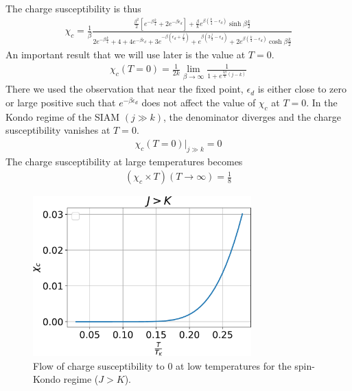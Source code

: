 \documentclass[12pt,twoside]{report}
\numberwithin{equation}{section}
\begin{document}
The charge susceptibility is thus
\begin{equation}\begin{aligned}
	\chi_c = \frac{1}{\beta}\frac{\frac{\beta^2}{2}\left[e^{-\beta \frac{k}{4}} + 2e^{-\beta \epsilon_d}\right] + \frac{\beta}{k}e^{\beta\left(\frac{k}{4} - \epsilon_d\right)}\sinh \beta\frac{k}{2}}{2e^{-\beta \frac{k}{4}} + 4 + 4e^{-\beta \epsilon_d} + 3e^{-\beta\left( \epsilon_d + \frac{j}{4} \right) } + e^{\beta\left( 3\frac{j}{4} - \epsilon_d \right)} + 2e^{\beta \left(\frac{k}{4} - \epsilon_d\right)}\cosh \beta \frac{k}{2}}
\end{aligned}\end{equation}
An important result that we will use later is the value at \(T=0\).
\begin{equation}\begin{aligned}
	\chi_c(T=0) =  \frac{1}{2k}\lim_{\beta \to \infty} \frac{1}{1 + e^{\frac{3\beta}{4} \left(j-k\right) }}
\end{aligned}\end{equation}
There we used the observation that near the fixed point, \(\epsilon_d\) is either close to zero or large positive such that \(e^{-\beta \epsilon_d}\) does not affect the value of \(\chi_c\) at \(T=0\). In the Kondo regime of the SIAM \((j \gg k)\), the denominator diverges and the charge susceptibility vanishes at \(T=0\).
\begin{equation}\begin{aligned}
	\chi_c(T=0)\bigg\vert_{j \gg k} = 0
\end{aligned}\end{equation}
The charge susceptibility at large temperatures becomes
\begin{equation}\begin{aligned}
	\left(\chi_c\times T\right) (T \to \infty) = \frac{1}{8}
\end{aligned}\end{equation}
\begin{figure}[htpb]
	\centering
	\includegraphics[width=0.75\textwidth]{../figures/chi_c.pdf}
	\caption{Flow of charge susceptibility to 0 at low temperatures for the spin-Kondo regime (\(J>K\)).}
\end{figure}
\end{document}
